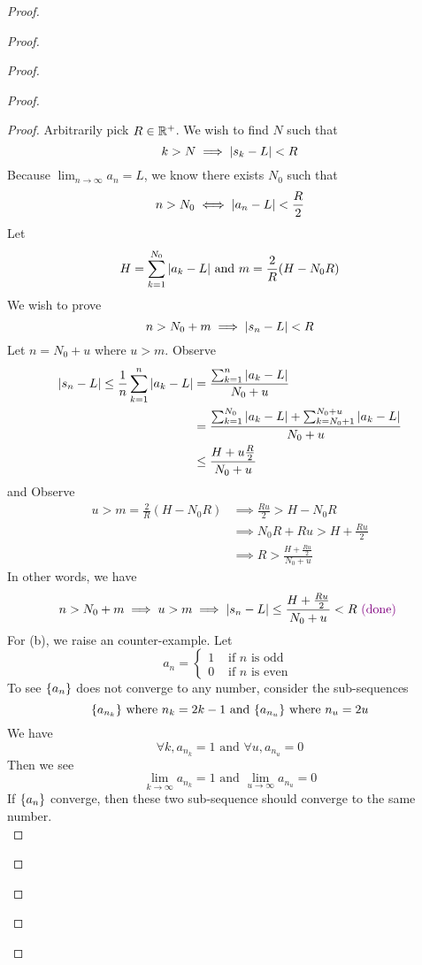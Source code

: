 \documentclass{report}
\begin{document}
\begin{proof}
\begin{proof}
\begin{proof}
\begin{proof}
\begin{proof}
Arbitrarily pick $R\in\mathbb{R}^+$. We wish to find $N$ such that 
 \begin{equation}
k>N\implies |s_k-L|<R
\end{equation}
Because $\lim_{n\to\infty}a_n=L$, we know there exists $N_0$ such that 
 \begin{equation}
n>N_0\iff |a_n-L|<\frac{R}{2}
\end{equation}
Let
\begin{equation}
H=\sum_{k=1}^{N_0} |a_k-L|\text{ and }m=\frac{2}{R}(H-N_0R)
\end{equation}
We wish to prove
\begin{equation}
n>N_0+m \implies |s_n-L|<R
\end{equation}
Let $n=N_0+u$ where $u>m$. Observe
\begin{align}
  |s_n-L|\leq \frac{1}{n}\sum_{k=1}^n |a_k-L|&=\frac{\sum_{k=1}^n |a_k-L|}{N_0+u}\\
  &= \frac{\sum_{k=1}^{N_0} |a_k-L|+\sum_{k=N_0+1}^{N_0+u} |a_k-L|}{N_0+u}\\
  &\leq \frac{H+u \frac{R}{2}}{N_0+u}
\end{align}
and Observe 
\begin{align}
  u>m=\frac{2}{R}(H-N_0R)&\implies \frac{Ru}{2}>H-N_0R\\
                         &\implies N_0R+ Ru>H+ \frac{Ru}{2}\\
&\implies R>\frac{H+\frac{Ru}{2}}{N_0+u}
\end{align}
In other words, we have
\begin{equation}
n>N_0+m \implies u>m\implies |s_n-L|\leq \frac{H+\frac{Ru}{2}}{N_0+u}<R\textcolor{violet}{\text{ (done) }}
\end{equation}
For (b), we raise an counter-example. Let
\begin{equation}
a_n=\begin{cases}
  1& \text{ if $n$ is odd }\\
  0& \text{ if $n$ is even }
\end{cases}
\end{equation}
To see $\{ a_n \}$ does not converge to any number, consider the sub-sequences
\begin{equation}
\{ a_{n_k} \}\text{ where }n_k=2k-1\text{ and }\{ a_{n_u} \}\text{ where }n_u=2u
\end{equation}
We have
\begin{equation}
\forall k,a_{n_k}=1\text{ and }\forall u,a_{n_u}=0
\end{equation}
Then we see 
\begin{equation}
\lim_{k\to\infty}a_{n_k}=1\text{ and }\lim_{u\to\infty}a_{n_u}=0
\end{equation}
If $\{ a_n \}$ converge, then these two sub-sequence should converge to the same number.\\


\end{proof}
\end{proof}
\end{proof}
\end{proof}
\end{proof}
\end{document}

